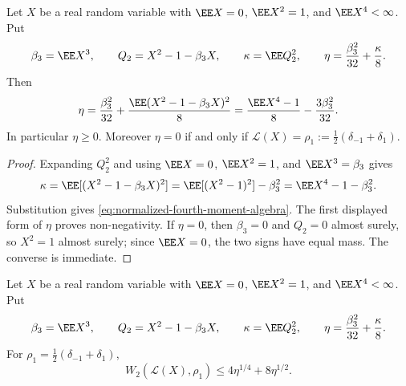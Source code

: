 \begin{lemma}%
\label{lem:normalized-fourth-moment-defect-algebra}
Let \(X\) be a real random variable with \(\EE X=0\), \(\EE X^2=1\), and
\(\EE X^4<\infty\).  Put
\[
\beta_3=\EE X^3,\qquad
Q_2=X^2-1-\beta_3X,\qquad
\kappa=\EE Q_2^2,\qquad
\eta=\frac{\beta_3^2}{32}+\frac{\kappa}{8}.
\]
Then
\begin{equation}\label{eq:normalized-fourth-moment-algebra}
\eta
=\frac{\beta_3^2}{32}+\frac{\EE(X^2-1-\beta_3X)^2}{8}
=\frac{\EE X^4-1}{8}-\frac{3\beta_3^2}{32}.
\end{equation}
In particular \(\eta\ge0\).  Moreover \(\eta=0\) if and only if
\(\mathcal L(X)=\rho_1:=\frac12(\delta_{-1}+\delta_1)\).
\end{lemma}

\begin{proof}
Expanding \(Q_2^2\) and using \(\EE X=0\), \(\EE X^2=1\), and
\(\EE X^3=\beta_3\) gives
\[
\kappa
=\EE[(X^2-1-\beta_3X)^2]
=\EE[(X^2-1)^2]-\beta_3^2
=\EE X^4-1-\beta_3^2.
\]
Substitution gives \eqref{eq:normalized-fourth-moment-algebra}.  The first
displayed form of \(\eta\) proves non-negativity.  If \(\eta=0\), then
\(\beta_3=0\) and \(Q_2=0\) almost surely, so \(X^2=1\) almost surely; since
\(\EE X=0\), the two signs have equal mass.  The converse is immediate.
\end{proof}

\begin{lemma}%
\label{lem:normalized-fourth-moment-w2-coupling}
Let \(X\) be a real random variable with \(\EE X=0\), \(\EE X^2=1\), and
\(\EE X^4<\infty\).  Put
\[
\beta_3=\EE X^3,\qquad
Q_2=X^2-1-\beta_3X,\qquad
\kappa=\EE Q_2^2,\qquad
\eta=\frac{\beta_3^2}{32}+\frac{\kappa}{8}.
\]
For \(\rho_1=\frac12(\delta_{-1}+\delta_1)\),
\begin{equation}\label{eq:normalized-sign-rademacher-coupling}
W_2(\mathcal L(X),\rho_1)
\le 4\eta^{1/4}+8\eta^{1/2}.
\end{equation}
\end{lemma}

